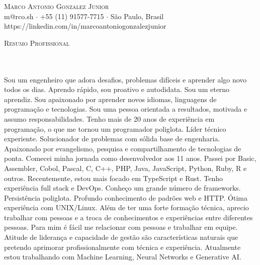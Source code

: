 \documentclass[a4paper]{article}
\newcommand{\lineunder} {
    \vspace*{-8pt} \\
    \hspace*{-18pt} \hrulefill \\
}
\newcommand{\header} [1] {
    {\hspace*{-18pt}\vspace*{6pt} \textsc{#1}}
    \vspace*{-6pt} \lineunder
}
\begin{document}
\newlength{\sectionindent}
\setlength{\sectionindent}{-0.4in} %

\renewcommand{\header}[1] {
    {\hspace*{-18pt}\vspace*{6pt} \textsc{#1}}
    \vspace*{-6pt} 
\lineunder
}
\vspace*{-40pt}

\vspace*{-10pt}
\begin{center}
    {\Huge \scshape {Marco Antonio Gonzalez Junior}}                \\
    \vspace{2.5pt}
    m@rco.sh $\cdot$ +55 (11) 91577-7715 $\cdot$ São Paulo, Brasil  \\
    \vspace{2.5pt}
    https://linkedin.com/in/marcoantoniogonzalezjunior              \\
\end{center}

\header{Resumo Profissional}
Sou um engenheiro que adora desafios, problemas difíceis e aprender algo novo todos os dias. 
Aprendo rápido, sou proativo e autodidata. Sou um eterno aprendiz. 
Sou apaixonado por aprender novos idiomas, linguagens de programação e tecnologias. 
Sou uma pessoa orientada a resultados, motivada e assumo responsabilidades. 
Tenho mais de 20 anos de experiência em programação, o que me tornou um programador poliglota. Líder técnico experiente. 
Solucionador de problemas com sólida base de engenharia. Apaixonado por evangelismo, pesquisa e compartilhamento de tecnologias de ponta. 
Comecei minha jornada como desenvolvedor aos 11 anos. Passei por Basic, Assembler, Cobol, Pascal, C, C++, PHP, Java, JavaScript, Python, Ruby, R e outros. 
Recentemente, estou mais focado em TypeScript e Rust. Tenho experiência full stack e DevOps. 
Conheço um grande número de frameworks. Persistência poliglota. Profundo conhecimento de padrões web e HTTP. Ótima experiência com UNIX/Linux. 
Além de ter uma forte formação técnica, aprecio trabalhar com pessoas e a troca de conhecimentos e experiências entre diferentes pessoas. 
Para mim é fácil me relacionar com pessoas e trabalhar em equipe. 
Atitude de liderança e capacidade de gestão são características naturais que pretendo aprimorar profissionalmente com técnica e experiência. 
Atualmente estou trabalhando com Machine Learning, Neural Networks e Generative AI. 
\newline
\end{document}
